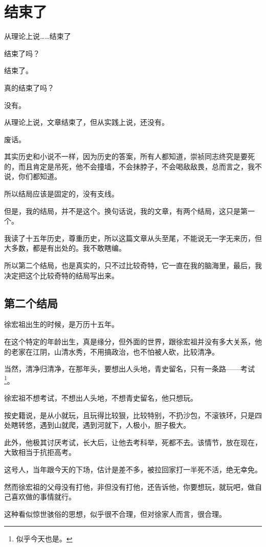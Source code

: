 \section{结束了}
\ifnum{}
	\begin{multicols}{\theparacolNo}
\fi
从理论上说……结束了

结束了吗？

结束了。

真的结束了吗？

没有。

从理论上说，文章结束了，但从实践上说，还没有。

废话。

其实历史和小说不一样，因为历史的答案，所有人都知道，崇祯同志终究是要死的，而且肯定是吊死，他不会撞墙，不会抹脖子，不会喝敌敌畏，总而言之，我不说，你们都知道。

所以结局应该是固定的，没有支线。

但是，我的结局，并不是这个。换句话说，我的文章，有两个结局，这只是第一个。

我读了十五年历史，尊重历史，所以这篇文章从头至尾，不能说无一字无来历，但大多数，都是有出处的。我不敢瞎编。

所以第二个结局，也是真实的，只不过比较奇特，它一直在我的脑海里，最后，我决定把这个比较奇特的结局写出来。

\subsection{第二个结局}
徐宏祖出生的时候，是万历十五年。

在这个特定的年龄出生，真是缘分，但外面的世界，跟徐宏祖并没有多大关系，他的老家在江阴，山清水秀，不用搞政治，也不怕被人砍，比较清净。

当然，清净归清净，在那年头，要想出人头地，青史留名，只有一条路——考试\footnote{似乎今天也是。}。

徐宏祖不想考试，不想出人头地，不想青史留名，他只想玩。

按史籍说，是从小就玩，且玩得比较狠，比较特别，不扔沙包，不滚铁环，只是四处瞎转悠，遇到山就爬，遇到河就下，人极小，胆子极大。

此外，他极其讨厌考试，长大后，让他去考科举，死都不去。该情节，放在现在，大致相当于抗拒高考。

这号人，当年跟今天的下场，估计是差不多，被拉回家打一半死不活，绝无幸免。

然而徐宏祖的父母没有打他，非但没有打他，还告诉他，你要想玩，就玩吧，做自己喜欢做的事情就行。

这种看似惊世骇俗的思想，似乎很不合理，但对徐家人而言，很合理。


\end{multicols}
